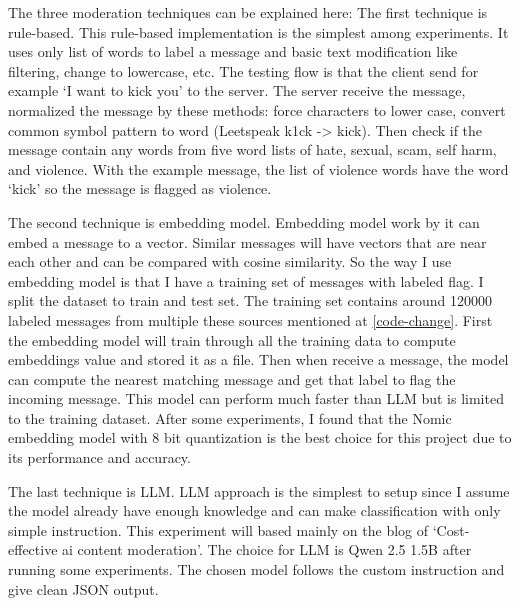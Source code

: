 \documentclass[
	english,
	accentcolor=9c,
	type=intern,
	marginpar=false,
	11pt
]{tudapub}
\begin{document}
The three moderation techniques can be explained here: The first technique is rule-based.
This rule-based implementation is the simplest among experiments.
It uses only list of words to label a message and basic text modification like filtering, change to lowercase, etc.
The testing flow is that the client send for example `I want to kick you' to the server.
The server receive the message, normalized the message by these methods: force characters to lower case, convert common symbol pattern to word (Leetspeak k1ck -> kick).
Then check if the message contain any words from five word lists of hate, sexual, scam, self harm, and violence.
With the example message, the list of violence words have the word `kick' so the message is flagged as violence.

The second technique is embedding model.
Embedding model work by it can embed a message to a vector.
Similar messages will have vectors that are near each other and can be compared with cosine similarity.
So the way I use embedding model is that I have a training set of messages with labeled flag.
I split the dataset to train and test set.
The training set contains around 120000 labeled messages from multiple these sources mentioned at \ref{code-change}.
First the embedding model will train through all the training data to compute embeddings value and stored it as a file.
Then when receive a message, the model can compute the nearest matching message and get that label to flag the incoming message.
This model can perform much faster than LLM but is limited to the training dataset.
After some experiments, I found that the Nomic embedding model with 8 bit quantization is the best choice for this project due to its performance and accuracy.

The last technique is LLM.
LLM approach is the simplest to setup since I assume the model already have enough knowledge and can make classification with only simple instruction.
This experiment will based mainly on the blog of `Cost-effective ai content moderation'\cite{cost-effective-moderation}.
The choice for LLM is Qwen 2.5 1.5B after running some experiments.
The chosen model follows the custom instruction and give clean JSON output.
\end{document}
